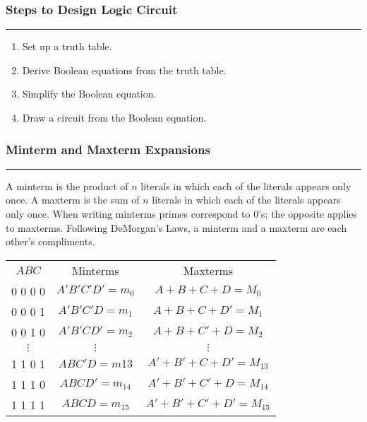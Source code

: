 \documentclass{article}
\begin{document}
    \medskip
    \subsubsection*{Steps to Design Logic Circuit}
    \vspace{-1em}
    \rule{\linewidth}{0.1mm}

    \begin{enumerate}
        \item Set up a truth table.
        \item Derive Boolean equations from the truth table.
        \item Simplify the Boolean equation.
        \item Draw a circuit from the Boolean equation.
    \end{enumerate}

    \smallskip
    \subsubsection*{Minterm and Maxterm Expansions}
    \vspace{-1em}
    \rule{\linewidth}{0.1mm}

    \smallskip\noindent
    A minterm is the product of $n$ literals in which each of the literals appears only once.
    A maxterm is the sum of $n$ literals in which each of the literals appears only once.
    When writing minterms primes correspond to 0's; the opposite applies to maxterms.
    Following DeMorgan's Laws, a minterm and a maxterm are each other's compliments.

    \begin{center}
        \begin{tabular}{c c c}
            $A B C$  & Minterms          & Maxterms                     \\
            0 0 0 0  & $A'B'C'D' = m_0$  & $A + B + C + D = M_0$        \\
            0 0 0 1  & $A'B'C'D = m_1$   & $A + B + C + D' = M_1$       \\
            0 0 1 0  & $A'B'CD' = m_2$   & $A + B + C' + D = M_2$       \\
            $\vdots$ & $\vdots$          & $\vdots$                     \\
            1 1 0 1  & $ABC'D = m{13}$   & $A' + B' + C + D' = M_{13}$  \\
            1 1 1 0  & $ABCD' = m_{14} $ & $A' + B' + C' + D = M_{14}$  \\
            1 1 1 1  & $ABCD = m_{15} $  & $A' + B' + C' + D' = M_{15}$
        \end{tabular}
    \end{center}
\end{document}
